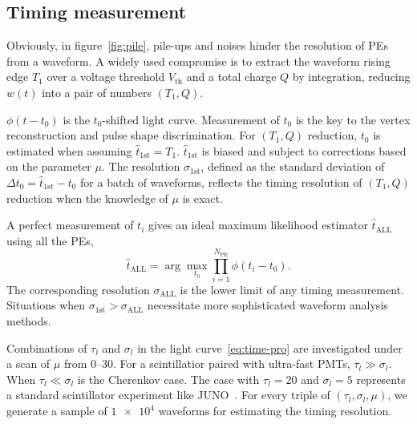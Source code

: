 \subsection{Timing measurement}
Obviously, in figure~\ref{fig:pile}, pile-ups and noises hinder the resolution of PEs from a waveform. A widely used compromise is to extract the waveform rising edge $T_1$ over a voltage threshold $V_\mathrm{th}$ and a total charge $Q$ by integration, reducing $w(t)$ into a pair of numbers $(T_1, Q)$.

$\phi(t-t_0)$ is the $t_0$-shifted light curve. Measurement of $t_0$ is the key to the vertex reconstruction and pulse shape discrimination. For $(T_1, Q)$ reduction, $t_0$ is estimated when assuming $\hat{t}_\mathrm{1st} = T_1$. $\hat{t}_\mathrm{1st}$ is biased and subject to corrections based on the parameter $\mu$. The resolution $\sigma_\mathrm{1st}$, defined as the standard deviation of $\Delta t_0 = \hat{t}_\mathrm{1st} - t_0$ for a batch of waveforms, reflects the timing resolution of $(T_1, Q)$ reduction when the knowledge of $\mu$ is exact. 

A perfect measurement of $t_i$ gives an ideal maximum likelihood estimator $\hat{t}_\mathrm{ALL}$ using all the PEs,
\begin{equation}
  \label{eq:2}
  \hat{t}_\mathrm{ALL} = \arg\underset{t_0}{\max} \prod_{i=1}^{N_\mathrm{PE}} \phi(t_i-t_0).
\end{equation}
The corresponding resolution $\sigma_\mathrm{ALL}$ is the lower limit of any timing measurement. Situations when $\sigma_\mathrm{1st} > \sigma_\mathrm{ALL}$ necessitate more sophisticated waveform analysis methods.

Combinations of $\tau_l$ and $\sigma_l$ in the light curve~\eqref{eq:time-pro} are investigated under a scan of $\mu$ from \numrange{0}{30}. For a scintillatior paired with ultra-fast PMTs, $\tau_l \gg \sigma_l$. When $\tau_l \ll \sigma_l$ is the Cherenkov case. The case with $\tau_l=20$ and $\sigma_l=5$ represents a standard scintillator experiment like JUNO~\cite{rebber_particle_2021}. For every triple of $(\tau_l, \sigma_l, \mu)$, we generate a sample of $\num[retain-unity-mantissa=false]{1e4}$ waveforms for estimating the timing resolution. 

